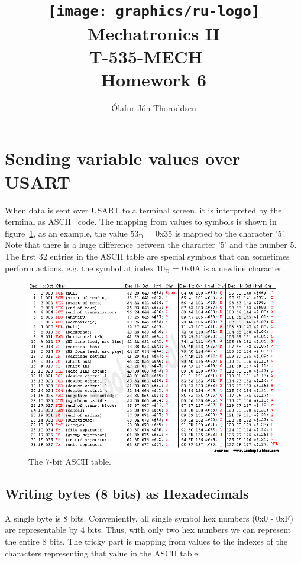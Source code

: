 \documentclass[11pt,a4paper,titlepage]{article}
\author{Ólafur Jón Thoroddsen}  %
\title{\texttt{[image: graphics/ru-logo]}\\\vspace{10mm}
	Mechatronics II\\T-535-MECH \ \\Homework 6}  %
\begin{document}
	\maketitle
	
	\tableofcontents
	\pagebreak
	
	\section{Sending variable values over USART\label{sec:usarthex}}
	
	When data is sent over USART to a terminal screen, it is interpreted by the terminal as ASCII~\cite{ascii} code. The mapping from values to symbols is shown in figure~\ref{fig:ascii}, as an example, the value $53_{\text{D}}$ = 0x35 is mapped to the character '5'. Note that there is a huge difference between the character '5' and the number 5. The first 32 entries in the ASCII table are special symbols that can sometimes perform actions, e.g. the symbol at index $10_{\text{D}}$ = 0x0A is a newline character.
	
	\begin{figure}[h]
		\centering
		\includegraphics[width=\textwidth]{graphics/ascii}
		\caption{The 7-bit ASCII table.}
		\label{fig:ascii}
	\end{figure}
	
	\subsection{Writing bytes (8 bits) as Hexadecimals}
	
	A single byte is 8 bits. Conveniently, all single symbol hex numbers (0x0 - 0xF) are representable by 4 bits. Thus, with only two hex numbers we can represent the entire 8 bits. The tricky part is mapping from values to the indexes of the characters representing that value in the ASCII table.
	
\end{document}

